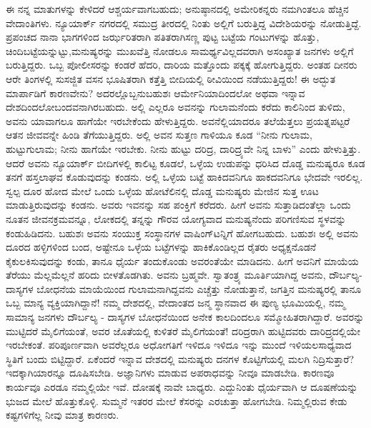 ಈ ನನ್ನ ಮಾತುಗಳನ್ನು ಕೇಳಿದರೆ ಆಶ್ಚರ್ಯವಾಗಬಹುದು; ಅನುಷ್ಠಾನದಲ್ಲಿ ಅಮೇರಿಕನ್ನರು ನಮಗಿಂತಲೂ ಹೆಚ್ಚಿನ ವೇದಾಂತಿಗಳು. ನ್ಯೂಯಾರ್ಕ್​ ನಗರದಲ್ಲಿ ಸಮುದ್ರ ತೀರದಲ್ಲಿ ನಿಂತು ಅಲ್ಲಿಗೆ ಬರುತ್ತಿದ್ದ ವಿದೇಶಿಯರನ್ನು ನೋಡುತ್ತಿದ್ದೆ. ಪ್ರಪಂಚದ ನಾನಾ ಭಾಗಗಳಿಂದ ಜರ್ಝರಿತರಾಗಿ ಪತಿತರಾಗಿ\break ಸಣ್ಣ ಪುಟ್ಟ ಬಟ್ಟೆಯ ಗಂಟುಗಳನ್ನು ಹೊತ್ತು, ಚಿಂದಿಬಟ್ಟೆಯನ್ನುಟ್ಟು,\break ಮನುಷ್ಯರನ್ನು ಮುಖವೆತ್ತಿ ನೋಡಲೂ ಸಾಮರ್ಥ್ಯವಿಲ್ಲದವರಾಗಿ ಅಸಂಖ್ಯಾತ ಜನಗಳು ಅಲ್ಲಿಗೆ ಬರುತ್ತಿದ್ದರು. ಒಬ್ಬ ಪೋಲೀಸರನ್ನು ಕಂಡರೆ ಹೆದರಿ, ದಾರಿಯ ಮತ್ತೊಂದು ಪಕ್ಕಕ್ಕೆ ಹೋಗುತ್ತಿದ್ದರು. ಅಂತಹ ದೀನರು ಆರೇ ತಿಂಗಳಲ್ಲಿ ಸುಸಜ್ಜಿತ ವಸನ ಭೂಷಿತರಾಗಿ ಕತ್ತೆತ್ತಿ ಬೀದಿಯಲ್ಲಿ ಠೀವಿಯಿಂದ ನಡೆಯುತ್ತಿದ್ದರು! ಈ ಅದ್ಭುತ ಮಾರ್ಪಾಡಿಗೆ ಕಾರಣವೇನು? ಅದರಲ್ಲೊಬ್ಬನು\break ಬಹುಶಃ ಆರ್ಮೇನಿಯಾದಿಂದಲೋ ಅಥವಾ ಇನ್ನಾವ ದೇಶದಿಂದಲೋ\break ಬಂದವನಾಗಿರಬಹುದು. ಅಲ್ಲಿ ಎಲ್ಲರೂ ಅವನನ್ನು ಗುಲಾಮನೆಂದು ಕರೆದು ಕಾಲಿನಿಂದ ತುಳಿದು, ಅವನು ಯಾವಾಗಲೂ ಹಾಗೆಯೇ ಇರಬೇಕೆಂದು ಹೇಳುತ್ತಿದ್ದರು. ಅವನೆಲ್ಲಿಯಾದರೂ ತಲೆಯೆತ್ತಲು ಪ್ರಯತ್ನಪಟ್ಟರೆ ಆತನ ಜೀವವನ್ನೇ ಹಿಂಡಿ ತೆಗೆಯುತ್ತಿದ್ದರು. ಅಲ್ಲಿ ಅವನ ಸುತ್ತಣ ಗಾಳಿಯೂ ಕೂಡ “ನೀನು ಗುಲಾಮ, ಹುಟ್ಟುಗುಲಾಮ; ನೀನು ಹಾಗೆಯೇ ಇರಬೇಕು. ನೀನು ಹುಟ್ಟು ದರಿದ್ರ, ದಾರಿದ್ರ್ಯವೇ ನಿನ್ನ ಬಾಳು” ಎಂದು ಹೇಳುತ್ತಿತ್ತು. ಆದರೆ ಅವನು ನ್ಯೂಯಾರ್ಕ್​ ಬೀದಿಗಳಲ್ಲಿ ಕಾಲಿಟ್ಟ ಕೂಡಲೆ, ಒಳ್ಳೆಯ ಉಡುಪನ್ನು ಧರಿಸಿದ ದೊಡ್ಡ ಮನುಷ್ಯರೂ ಕೂಡ ತನಗೆ ಹಸ್ತಲಾಘವ ಕೊಡುವುದನ್ನು ಕಂಡನು. ಅಲ್ಲಿ ಒಳ್ಳೆಯ ಬಟ್ಟೆ ಹಾಕಿದವನಿಗೂ ಹಾಕದವನಿಗೂ ಭೇದವೇ ಇರಲಿಲ್ಲ. ಸ್ವಲ್ಪ ದೂರ ಹೋದ ಮೇಲೆ ಒಂದು ಒಳ್ಳೆಯ ಹೋಟೆಲಿನಲ್ಲಿ ದೊಡ್ಡ ಮನುಷ್ಯರು ಮೇಜಿನ ಸುತ್ತ ಊಟ ಮಾಡುತ್ತಿರುವುದನ್ನು ಕಂಡನು. ಅವರು ಇವನನ್ನು ಸಹ ಪಂಕ್ತಿಗೆ ಕರೆದರು. ಹೀಗೆ ಅವನು ಸುತ್ತಾಡಿದಂತೆಲ್ಲಾ ಒಂದು ನೂತನ ಜೀವನಕ್ರಮವನ್ನೂ, ಲೋಕದಲ್ಲಿ ತನ್ನನ್ನು ಗೌರವ ಯೋಗ್ಯವಾದ ಮನುಷ್ಯನೆಂದು ಪರಿಗಣಿಸುವ ಸ್ಥಳವನ್ನು ಕಂಡುಹಿಡಿದನು. ಬಹುಶಃ ಅವನು ಸಂಯುಕ್ತ ಸಂಸ್ಥಾನಗಳ ವಾಷಿಂಗ್​ಟನ್ನಿಗೆ ಹೋಗಬಹುದು. ಬಹುಶಃ ಅಲ್ಲಿ ಅವನು ದೂರದ ಹಳ್ಳಿಗಳಿಂದ ಬಂದ, ಅಷ್ಟೇನೂ ಒಳ್ಳೆಯ ಬಟ್ಟೆಗಳನ್ನು ಹಾಕಿಕೊಂಡಿಲ್ಲದ ರೈತರು ಅಧ್ಯಕ್ಷನೊಡನೆ ಕೈಕುಲಕಿಸುವುದನ್ನು ಕಂಡು, ತಾನೂ ಧೈರ್ಯ ತಂದುಕೊಂಡು ಅವರಂತೆಯೇ ಮಾಡಿದನು. ಹೀಗೆ ಅವನಿಗೆ ಮಾಯೆಯ ತೆರೆಯು ಮೆಲ್ಲಮೆಲ್ಲನೆ ಹರಿದು ಬೀಳತೊಡಗಿತು. ಅವನು ಬ್ರಹ್ಮವೇ. ಸ್ವಾತಂತ್ರ್ಯ ಮೂರ್ತಿ\break ಯಾಗಿದ್ದ ಅವನು, ದೌರ್ಬಲ್ಯ-ದಾಸ್ಯಗಳ ಬೋಧನೆಯ ಮಾಯೆಯಿಂದ ಗುಲಾಮನಾಗಿದ್ದವನು ಎಚ್ಚೆತ್ತು ನೋಡುತ್ತಾನೆ, ಜಗತ್ತಿನ ಮನುಷ್ಯರಲ್ಲಿ ತಾನೂ ಒಬ್ಬ ಮಾನ್ಯ ವ್ಯಕ್ತಿಯಾಗಿದ್ದಾನೆ! ನಮ್ಮ ದೇಶದಲ್ಲಿ, ವೇದಾಂತದ ಜನ್ಮ ಸ್ಥಾನವಾದ ಈ ಪುಣ್ಯ ಭೂಮಿಯಲ್ಲಿ, ನಮ್ಮ ಸಾಮಾನ್ಯ ಜನಗಳು ದೌರ್ಬಲ್ಯ - ದಾಸ್ಯಗಳ ಬೋಧನೆಯಿಂದ ಅನೇಕ ಕಾಲದಿಂದಲೂ ಸಮ್ಮೋಹಿತರಾಗಿದ್ದಾರೆ. ಅವರನ್ನು ಮುಟ್ಟಿದರೆ ಮೈಲಿಗೆಯಂತೆ, ಅವರ ಜೊತೆಯಲ್ಲಿ ಕುಳಿತರೆ ಮೈಲಿಗೆಯಂತೆ! ದರಿದ್ರರಾಗಿ ಹುಟ್ಟಿದವರು ದಾರಿದ್ರ್ಯದಲ್ಲಿಯೇ ಇರಬೇಕಂತೆ. ಪರಿಪೂರ್ಣವಾಗಿ ಅವರೆಲ್ಲರೂ ಅಧೋಗತಿಗೆ ಇಳಿದೂ ಇಳಿದೂ ಇನ್ನು ಮುಂದೆ ಇಳಿಯಲಸಾಧ್ಯವಾದ ಸ್ಥಿತಿಗೆ ಬಂದು ಬಿಟ್ಟಿದ್ದಾರೆ. ಏಕೆಂದರೆ ಇನ್ನಾವ ದೇಶದಲ್ಲಿ ಮನುಷ್ಯರು ದನಗಳ ಕೊಟ್ಟಿಗೆಯಲ್ಲಿ ಮಲಗಿ ನಿದ್ರಿಸುತ್ತಾರೆ? ಇದಕ್ಕಾಗಿ\break ಯಾರನ್ನೂ ದೂಷಿಸಬೇಡಿ. ಅಜ್ಞಾನಿಗಳು ಮಾಡುವ ಅಪರಾಧವನ್ನು ನೀವೂ ಮಾಡಬೇಡಿ. ಕಾರಣವೂ ಕಾರ್ಯವೂ ಎರಡೂ ನಮ್ಮಲ್ಲಿಯೇ ಇವೆ. ದೋಷಕ್ಕೆ ನಾವೇ ಬಾಧ್ಯರು. ಎದ್ದುನಿಂತು ಧೈರ್ಯವಾಗಿ ಆ ದೂಷಣೆಯನ್ನು ಭುಜದ ಮೇಲೆ ಹೊತ್ತುಕೊಳ್ಳಿ. ಸುಮ್ಮನೆ ಇತರರ ಮೇಲೆ ಕೆಸರನ್ನು ಎರಚುತ್ತಾ ಹೋಗಬೇಡಿ. ನಿಮ್ಮಲ್ಲಿರುವ ಕೇಡು ಕಷ್ಟಗಳಿಗೆಲ್ಲ ನೀವು ಮಾತ್ರ ಕಾರಣರು.

